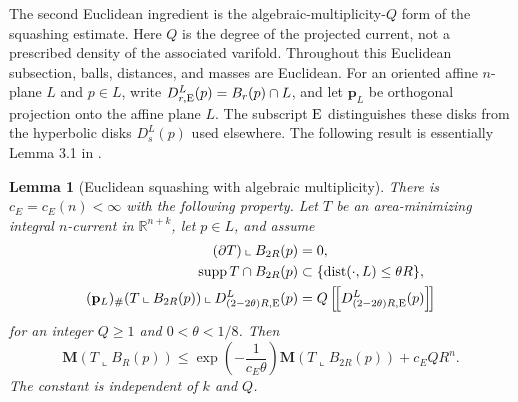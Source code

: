 \documentclass[11pt,reqno]{amsart}
\numberwithin{equation}{section}
\newtheorem{lemma}[lemma]{Lemma}
\theoremstyle{definition}
\theoremstyle{remark}
\newcommand{\R}{\mathbb R}
\newcommand{\Mass}{\mathbf M}
\newcommand{\supp}{\operatorname{supp}}
\newcommand{\dist}{\operatorname{dist}}
\newcommand{\restr}{\mathbin{\llcorner}}
\newcommand{\cur}[1]{\left[\!\left[#1\right]\!\right]}
\begin{document}
The second Euclidean ingredient is the algebraic-multiplicity-$Q$ form of the
squashing estimate.  Here $Q$ is the degree of the projected current, not a
prescribed density of the associated varifold.  Throughout this Euclidean
subsection, balls, distances, and masses are Euclidean.  For an oriented
affine $n$-plane $L$ and $p\in L$,
write
$D_{r,{\rm E}}^L(p)=B_r(p)\cap L$, and let $\mathbf p_L$ be orthogonal
projection onto the affine plane $L$.  The subscript ${\rm E}$ distinguishes
these disks from the hyperbolic disks $D_s^L(p)$ used elsewhere. The following result is essentially Lemma 3.1 in \cite{JiangXie}.

\begin{lemma}[Euclidean squashing with algebraic multiplicity]
\label{lem:Euclidean-squashing}
There is $c_E=c_E(n)<\infty$ with the following property.  Let $T$ be an
area-minimizing integral $n$-current in $\R^{n+k}$, let $p\in L$, and assume
\begin{align}
 (\partial T)\restr B_{2R}(p)&=0,\label{eq:E-squash-boundary}\\
 \supp T\cap B_{2R}(p)&\subset\{\dist(\cdot,L)\le\theta R\},
 \label{eq:E-squash-tube}\\
 (\mathbf p_L)_\#(T\restr B_{2R}(p))
 \restr D_{(2-2\theta)R,{\rm E}}^L(p)
 &=Q\cur{D_{(2-2\theta)R,{\rm E}}^L(p)}
 \label{eq:E-squash-projection}
\end{align}
for an integer $Q\ge1$ and $0<\theta<1/8$.  Then
\begin{equation}\label{eq:E-squash-conclusion}
 \Mass(T\restr B_R(p))
 \le \exp\!\left(-\frac{1}{c_E\theta}\right)
       \Mass(T\restr B_{2R}(p))+c_EQR^n.
\end{equation}
The constant is independent of $k$ and $Q$.
\end{lemma}
\end{document}
